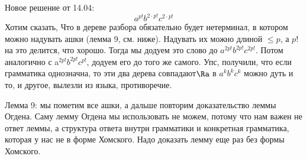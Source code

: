 	Новое решение от 14.04:
	\[ a^{p!}b^{2\cdot p!}c^{2\cdot p!} \]
	Хотим сказать, Что в дереве разбора обязательно будет нетерминал, в котором можно надувать ашки (лемма 9, см. ниже).
	Надувать их можно длиной $\le p$, а $p!$ на это делится, что хорошо.
	Тогда мы додуем это слово до $a^{2p!} b^{2p!} c^{2p!}$.
	Потом аналогично с a$^{2p!}b^{2p!}c^{p!}$, додуем его до того же самого.
	Упс, получили, что если грамматика однозначна, то эти два дерева совпадают$\Ra$
	в $a^k b^k c^k$ можно дуть и то, и другое, вылезли из языка, противоречие.

	Лемма 9: мы пометим все ашки, а дальше повторим доказательство леммы Огдена.
	Саму лемму Огдена мы использовать не можем, потому что нам важен не ответ леммы, а структура ответа внутри грамматики и конкретная грамматика,
	которая у нас не в форме Хомского. Надо доказать лемму еще раз без формы Хомского.
